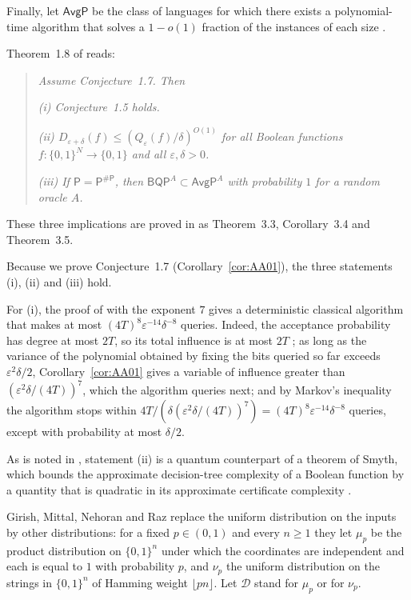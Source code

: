 \documentclass[11pt,reqno]{amsart}
\theoremstyle{definition}
\theoremstyle{remark}
\numberwithin{equation}{section}
\theoremstyle{named}
\theoremstyle{plain}
\newcommand{\eps}{\varepsilon}
\begin{document}
Finally, let
$\mathsf{AvgP}$ be the class of languages for which there exists a polynomial-time
algorithm that solves a $1-o(1)$ fraction of the instances of each size
\cite[Section~1.1]{AA14}.

Theorem~1.8 of \cite{AA14} reads:

\begin{quote}
\emph{Assume Conjecture~1.7. Then}

\smallskip
\emph{\textup{(i)} Conjecture~1.5 holds.}

\smallskip
\emph{\textup{(ii)} $D_{\eps+\delta}(f)\le(Q_{\eps}(f)/\delta)^{O(1)}$ for all Boolean functions
$f\colon\{0,1\}^{N}\to\{0,1\}$ and all $\eps,\delta>0$.}

\smallskip
\emph{\textup{(iii)} If\/ $\mathsf{P}=\mathsf{P}^{\#\mathsf{P}}$, then
$\mathsf{BQP}^{A}\subset\mathsf{AvgP}^{A}$ with probability $1$ for a random oracle $A$.}
\end{quote}

\noindent These three implications are proved in \cite{AA14} as Theorem~3.3, Corollary~3.4 and
Theorem~3.5.

Because we prove Conjecture~1.7 (Corollary~\ref{cor:AA01}), the three statements (i), (ii) and
(iii) hold.

For (i), the proof of \cite[Theorem~3.3]{AA14} with the exponent $7$ gives a deterministic classical
algorithm that makes at most $(4T)^{8}\eps^{-14}\delta^{-8}$ queries. Indeed, the acceptance
probability has degree at most $2T$, so its total influence is at most $2T$ \cite[Lemma~3.1]{AA14};
as long as the variance of the polynomial obtained by fixing the bits queried so far exceeds
$\eps^{2}\delta/2$, Corollary~\ref{cor:AA01} gives a variable of influence greater than
$(\eps^{2}\delta/(4T))^{7}$, which the algorithm queries next; and by Markov's inequality the
algorithm stops within $4T/(\delta(\eps^{2}\delta/(4T))^{7})=(4T)^{8}\eps^{-14}\delta^{-8}$ queries,
except with probability at most $\delta/2$.

As is noted in \cite[Section~1.1]{AA14}, statement (ii) is a quantum counterpart of a theorem
of Smyth, which bounds the approximate decision-tree complexity of a Boolean function by a quantity
that is quadratic in its approximate certificate complexity \cite{Smy02,Smy}.

Girish, Mittal, Nehoran and Raz \cite{GMNR} replace the uniform distribution on the inputs by other
distributions: for a fixed $p\in(0,1)$ and every $n\ge1$ they let $\mu_p$ be the product distribution
on $\{0,1\}^{n}$ under which the coordinates are independent and each is equal to $1$ with
probability $p$, and $\nu_p$ the uniform distribution on the strings in $\{0,1\}^{n}$ of Hamming
weight $\lfloor pn\rfloor$. Let $\mathcal{D}$ stand for $\mu_p$ or for $\nu_p$.
\end{document}
